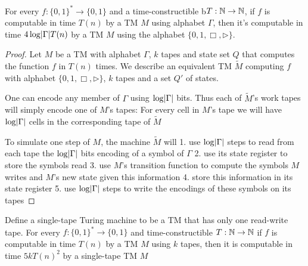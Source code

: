 \documentclass[11pt]{article}
\begin{document}
\begin{proposition}[]
For every \(f:\{0,1\}^*\to\{0,1\}\) and a time-constructible b\(T:\mathbb{N}\to\mathbb{N}\), if \(f\) is
computable in time \(T(n)\) by a TM \(M\) using alphabet \(\Gamma\), then it's computable in time
\(4\log\abs{\Gamma}T(n)\) by a TM \(M\) using the alphabet \(\{0,1,\Box,\rhd\}\).
\end{proposition}

\begin{proof}
Let \(M\) be a TM with alphabet \(\Gamma\), \(k\) tapes and state set \(Q\) that computes the
function \(f\) in \(T(n)\) times. We describe an equivalent TM \(\tilde{M}\) computing \(f\)
with alphabet \(\{0,1,\Box,\rhd\}\), \(k\) tapes and a set \(Q'\) of states.

One can encode any member of \(\Gamma\) using \(\log\abs{\Gamma}\) bits. Thus each of \(\tilde{M}\)'s work
tapes will simply encode one of \(M\)'s tapes: For every cell in \(M\)'s tape we will
have \(\log\abs{\Gamma}\) cells in the corresponding tape of \(\tilde{M}\)

To simulate one step of \(M\), the machine \(\tilde{M}\) will 1. use \(\log\abs{\Gamma}\) steps to
read from each tape the \(\log\abs{\Gamma}\) bits encoding of a symbol of \(\Gamma\) 2. use its state register
to store the symbols read 3. use \(M\)'s transition function to compute the symbols \(M\) writes
and \(M\)'s new state given this information 4. store this information in its state register 5.
use \(\log\abs{\Gamma}\) steps to write the encodings of these symbols on its tapes
\end{proof}

\begin{proposition}[]
\label{prop1.6}
Define a single-tape Turing machine to be a TM that has only one read-write tape. For every
\(f:\{0,1\}^*\to\{0,1\}\) and time-constructible \(T:\mathbb{N}\to\mathbb{N}\) if \(f\) is computable in
time \(T(n)\) by a TM \(M\) using \(k\) tapes, then it is computable in time \(5kT(n)^2\) by a
single-tape TM \(M\)
\end{proposition}
\end{document}
